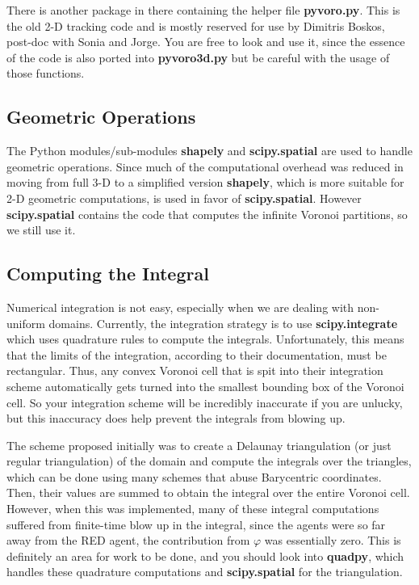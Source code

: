 \documentclass{article}
\begin{document}
There is another package in there containing the helper file \textbf{pyvoro.py}. This is the old 2-D tracking code and is mostly reserved for use by Dimitris Boskos, post-doc with Sonia and Jorge. You are free to look and use it, since the essence of the code is also ported into \textbf{pyvoro3d.py} but be careful with the usage of those functions. 
\subsection{Geometric Operations}
The Python modules/sub-modules \textbf{shapely} and \textbf{scipy.spatial} are used to handle geometric operations. Since much of the computational overhead was reduced in moving from full 3-D to a simplified version \textbf{shapely}, which is more suitable for 2-D geometric computations, is used in favor of \textbf{scipy.spatial}. However \textbf{scipy.spatial} contains the code that computes the infinite Voronoi partitions, so we still use it.
\subsection{Computing the Integral}
Numerical integration is not easy, especially when we are dealing with non-uniform domains. Currently, the integration strategy is to use \textbf{scipy.integrate} which uses quadrature rules to compute the integrals. Unfortunately, this means that the limits of the integration, according to their documentation, must be rectangular. Thus, any convex Voronoi cell that is spit into their integration scheme automatically gets turned into the smallest bounding box of the Voronoi cell. So your integration scheme will be incredibly inaccurate if you are unlucky, but this inaccuracy does help prevent the integrals from blowing up.

The scheme proposed initially was to create a Delaunay triangulation (or just regular triangulation) of the domain and compute the integrals over the triangles, which can be done using many schemes that abuse Barycentric coordinates. Then, their values are summed to obtain the integral over the entire Voronoi cell. However, when this was implemented, many of these integral computations suffered from finite-time blow up in the integral, since the agents were so far away from the RED agent, the contribution from $\varphi$ was essentially zero. This is definitely an area for work to be done, and you should look into \textbf{quadpy}, which handles these quadrature computations and \textbf{scipy.spatial} for the triangulation. 
\end{document}
